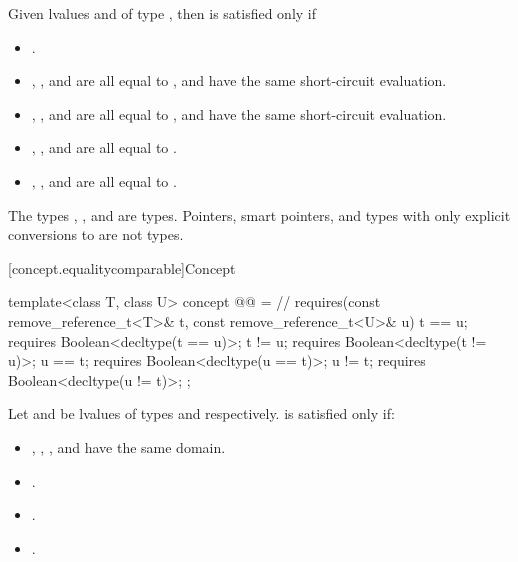 \pnum
Given lvalues  and  of type
,
then  is satisfied only if

\begin{itemize}
\item {}.
\item {}, , and
       are all equal to
      , and have the same short-circuit
      evaluation.
\item {}, , and
       are all equal to
      , and have the same short-circuit
      evaluation.
\item {}, , and
       are all equal to
      .
\item {}, , and
       are all equal to
      .
\end{itemize}

\pnum
\begin{example}
The types , , and
 are 
types. Pointers, smart pointers, and types with only explicit conversions to
 are not  types.
\end{example}

[concept.equalitycomparable]{Concept }

\begin{itemdecl}
template<class T, class U>
  concept @@ = // \expos
    requires(const remove_reference_t<T>& t,
             const remove_reference_t<U>& u) {
      t == u; requires Boolean<decltype(t == u)>;
      t != u; requires Boolean<decltype(t != u)>;
      u == t; requires Boolean<decltype(u == t)>;
      u != t; requires Boolean<decltype(u != t)>;
    };
\end{itemdecl}

\begin{itemdescr}
\pnum
Let  and  be lvalues of types
 and
 respectively.
is satisfied only if:
\begin{itemize}
\item {}, , , and 
      have the same domain.
\item {}.
\item {}.
\item {}.
\end{itemize}
\end{itemdescr}

